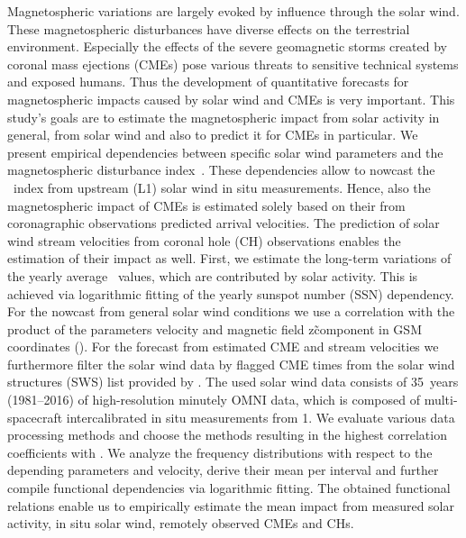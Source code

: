 

% 
% 

\abstracty
{Magnetospheric variations are largely evoked by influence through the solar wind. These magnetospheric disturbances have diverse effects on the terrestrial environment. Especially the effects of the severe geomagnetic storms created by coronal mass ejections (CMEs) pose various threats to sensitive technical systems and exposed humans. Thus the development of quantitative forecasts for magnetospheric impacts caused by solar wind and CMEs is very important.}	%
{This study's goals are to estimate the magnetospheric impact from solar activity in general, from solar wind and also to predict it for CMEs in particular. We present empirical dependencies between specific solar wind parameters and the magnetospheric disturbance index~\Kp{}. These dependencies allow to nowcast the \Kp~index from upstream (L1) solar wind in situ measurements. Hence, also the magnetospheric impact of CMEs is estimated solely based on their from coronagraphic observations predicted arrival velocities. The prediction of solar wind stream velocities from coronal hole (CH) observations enables the estimation of their impact as well.}	%
{First, we estimate the long-term variations of the yearly average \Kp{}~values, which are contributed by solar activity. This is achieved via logarithmic fitting of the yearly sunspot number (SSN) dependency. For the \Kp{} nowcast from general solar wind conditions we use a correlation with the product of the parameters velocity and magnetic field z\~component in GSM coordinates (\vBz{}). For the \Kp{} forecast from estimated CME and stream velocities we furthermore filter the solar wind data by flagged CME times from the solar wind structures (SWS) list provided by \citet{Richardson2012}. The used solar wind data consists of 35~years (1981--2016) of high-resolution minutely OMNI data, which is composed of multi-spacecraft intercalibrated in situ measurements from \SI{1}{\au}. We evaluate various data processing methods and choose the methods resulting in the highest correlation coefficients with \Kp{}. We analyze the \Kp{} frequency distributions with respect to the depending parameters \vBz{} and velocity, derive their mean \Kp{} per interval and further compile functional dependencies via logarithmic fitting.}	%
{The obtained functional relations enable us to empirically estimate the mean \Kp{} impact from measured solar activity, in situ solar wind, remotely observed CMEs and CHs.}	%
{}	%

% 
